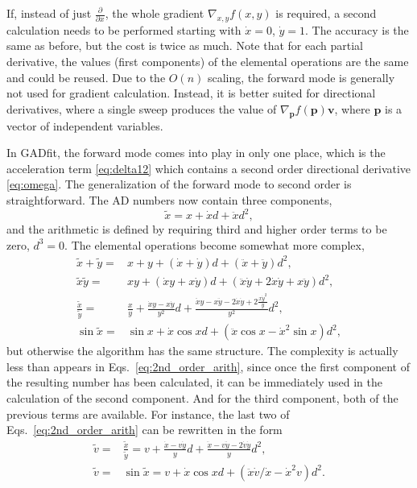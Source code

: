 \documentclass{article}
\begin{document}
If, instead of just $\frac{\partial}{\partial x}$, the whole gradient $\nabla_{x,y}f(x,y)$ is required, a second calculation needs to be performed starting with $\dot x = 0$, $\dot y = 1$. The accuracy is the same as before, but the cost is twice as much. Note that for each partial derivative, the values (first components) of the elemental operations are the same and could be reused. Due to the $O(n)$ scaling, the forward mode is generally not used for gradient calculation. Instead, it is better suited for directional derivatives, where a single sweep produces the value of $\nabla_{\bm p}f(\bm p)\bm v$, where $\bm p$ is a vector of independent variables.

In GADfit, the forward mode comes into play in only one place, which is the acceleration term \eqref{eq:delta12} which contains a second order directional derivative \eqref{eq:omega}. The generalization of the forward mode to second order is straightforward. The AD numbers now contain three components,
\begin{equation}
  \label{eq:adcomplex}
  \tilde x = x + \dot x d + \ddot x d^2,
\end{equation}
and the arithmetic is defined by requiring third and higher order terms to be zero, $d^3 = 0$. The elemental operations become somewhat more complex,
\begin{equation}
  \label{eq:2nd_order_arith}
  \begin{split}
    \tilde x + \tilde y =& x + y + (\dot x + \dot y)d + (\ddot x +
    \ddot y)d^2, \\
    \tilde x\tilde y =& xy + (\dot xy + x\dot y)d +
    (\ddot x\dot y + 2\dot x\dot y + x\ddot y)d^2, \\
    \frac{\tilde x}{\tilde y} =& \frac{x}{y} + \frac{\dot xy-x\dot
      y}{y^2}d + \frac{\ddot xy-x\ddot y-2\dot x\dot y+2\frac{x\dot
        y^2}{y}}{y^2}d^2, \\
    \sin\tilde x =& \sin x + \dot x\cos x d + (\ddot x\cos x - \dot
    x^2\sin x) d^2,
  \end{split}
\end{equation}
but otherwise the algorithm has the same structure. The complexity is actually less than appears in Eqs.~\eqref{eq:2nd_order_arith}, since once the first component of the resulting number has been calculated, it can be immediately used in the calculation of the second component. And for the third component, both of the previous terms are available. For instance, the last two of Eqs.~\eqref{eq:2nd_order_arith} can be rewritten in the form
\begin{equation}
  \label{eq:2nd_order_arith_compact}
  \begin{split}
    \tilde v =& \frac{\tilde x}{\tilde y} = v + \frac{\dot x-v\dot
      y}{y}d + \frac{\ddot x-v\ddot y-2\dot v\dot y}{y}d^2, \\
    \tilde v =& \sin\tilde x = v + \dot x\cos x d + (\ddot x\dot
    v/\dot x - \dot x^2v) d^2.
  \end{split}
\end{equation}
\end{document}
